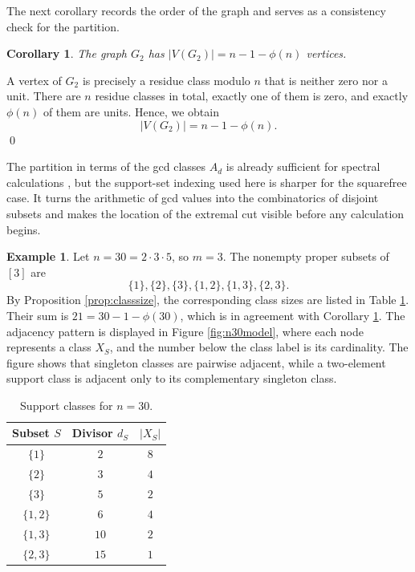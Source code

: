 \documentclass[12pt]{article}
\renewenvironment{proof}{{\bf \noindent Proof.}}{\qed}
\newtheorem{corollary}[theorem]{Corollary}
\theoremstyle{definition}
\newtheorem{example}[theorem]{Example}
\begin{document}
	\medskip
	 The next corollary records the order of the graph and serves as a consistency check for the partition.	
	\begin{corollary}\label{cor:order}
		The graph $G_2$ has $ |V(G_2)|=n-1-\phi(n) $ vertices.
	\end{corollary}
	
	\begin{proof}
		A vertex of $G_2$ is precisely a residue class modulo $n$ that is neither zero nor a unit. There are $n$ residue classes in total, exactly one of them is zero, and exactly $\phi(n)$ of them are units. Hence, we obtain
		$$
		|V(G_2)|=n-1-\phi(n).
		$$
	\end{proof}
	
	The partition in terms of the gcd classes $A_d$ is already sufficient for spectral calculations \cite{Banerjee2022, afkhami}, but the support-set indexing used here is sharper for the squarefree case. It turns the arithmetic of gcd values into the combinatorics of disjoint subsets and makes the location of the extremal cut visible before any calculation begins.
	\begin{example}\label{ex:n30classes}
		Let $n=30=2\cdot 3\cdot 5$, so $m=3$. The nonempty proper subsets of $[3]$ are
		$$
		\{1\},\{2\},\{3\},\{1,2\},\{1,3\},\{2,3\}.
		$$
		By Proposition \ref{prop:classsize}, the corresponding class sizes are listed in Table \ref{tab:n30classes}. Their sum is $21=30-1-\phi(30)$, which is in agreement with Corollary \ref{cor:order}. The adjacency pattern is displayed in Figure \ref{fig:n30model}, where each node represents a class $X_S$, and the number below the class label is its cardinality. The figure shows that singleton classes are pairwise adjacent, while a two-element support class is adjacent only to its complementary singleton class.
	\end{example}
	\begin{table}[H]
		\centering
		\caption{Support classes for $n=30$.}
		\label{tab:n30classes}
		\begin{tabular}{ccc}
			\toprule
			Subset $S$ & Divisor $d_S$ & $|X_S|$ \\
			\midrule
			$\{1\}$ & $2$ & $8$ \\
			$\{2\}$ & $3$ & $4$ \\
			$\{3\}$ & $5$ & $2$ \\
			$\{1,2\}$ & $6$ & $4$ \\
			$\{1,3\}$ & $10$ & $2$ \\
			$\{2,3\}$ & $15$ & $1$ \\
			\bottomrule
		\end{tabular}
	\end{table}
	
\end{document}
